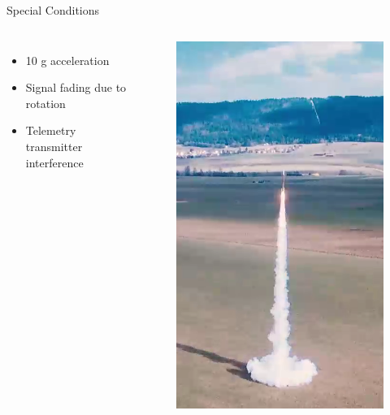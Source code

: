 \documentclass[12pt, compress, xcolor=table]{beamer}
\begin{document}
\begin{frame}{Special Conditions}
 \begin{columns}
 
  \begin{itemize}
   \setlength\itemsep{0.5cm}
   \item 10 g acceleration
   \item Signal fading due to rotation
   \item Telemetry transmitter interference
  \end{itemize}
  
  \begin{figure}
   \includegraphics[width=\textwidth]{images/Mestral_Launch.png}
  \end{figure}
 
 \end{columns}
\end{frame}
\end{document}
